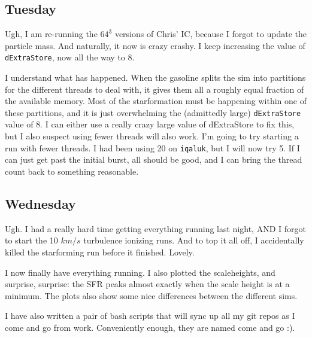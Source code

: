 \documentclass[11pt,letterpaper]{article}
\begin{document}
\subsection{Tuesday}

Ugh, I am re-running the $64^3$ versions of Chris' IC, because I forgot
to update the particle mass. And naturally, it now is crazy crashy. I
keep increasing the value of \texttt{dExtraStore}, now all the way to 8.

I understand what has happened. When the gasoline splits the sim into
partitions for the different threads to deal with, it gives them all a
roughly equal fraction of the available memory. Most of the
starformation must be happening within one of these partitions, and it
is just overwhelming the (admittedly large) \texttt{dExtraStore} value
of 8. I can either use a really crazy large value of dExtraStore to fix
this, but I also suspect using fewer threads will also work. I'm going
to try starting a run with fewer threads. I had been using 20 on
\texttt{iqaluk}, but I will now try 5. If I can just get past the
initial burst, all should be good, and I can bring the thread count back
to something reasonable.

\subsection{Wednesday}

Ugh. I had a really hard time getting everything running last night, AND
I forgot to start the 10 $km/s$ turbulence ionizing runs. And to top it
all off, I accidentally killed the starforming run before it finished.
Lovely.

I now finally have everything running. I also plotted the scaleheights,
and surprise, surprise: the SFR peaks almost exactly when the scale
height is at a minimum. The plots also show some nice differences
between the different sims.

I have also written a pair of bash scripts that will sync up all my git
repos as I come and go from work. Conveniently enough, they are named
come and go :).
\end{document}
